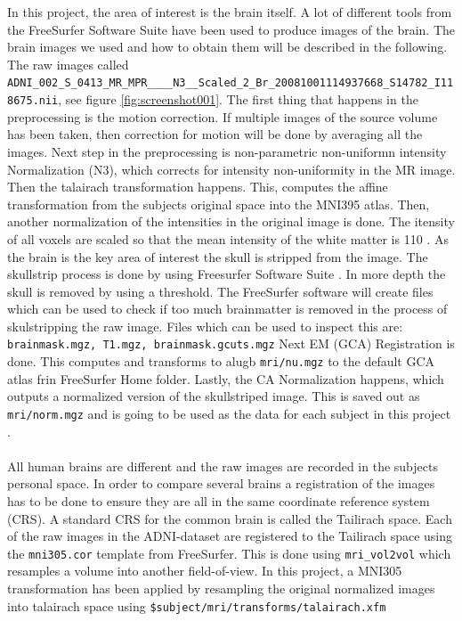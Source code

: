 \documentclass[12pt, fleqn, titlepage]{article}
\begin{document}
In this project, the area of interest is the brain itself. A lot of different tools from the FreeSurfer Software Suite have been used to produce images of the brain. The brain images we used and how to obtain them will be described in the following. The raw images called \newline \texttt{
ADNI\_002\_S\_0413\_MR\_MPR\_\_\_\_N3\_\_Scaled\_2\_Br\_20081001114937668\_S14782\_I118675.nii}, see figure \ref{fig:screenshot001}. The first thing that happens in the preprocessing is the motion correction. If multiple images of the source volume has been taken, then correction for motion will be done by averaging all the images.
Next step in the preprocessing is non-parametric non-uniformn intensity Normalization (N3), which corrects for intensity non-uniformity in the MR image.
Then the talairach transformation happens. This, computes the affine transformation from the subjects original space into the MNI395 atlas.
Then, another normalization of the intensities in the original image is done. The itensity of all voxels are scaled so that the mean intensity of the white matter is 110 \cite{normalize}. 
As the brain is the key area of interest the skull is stripped from the image. The skullstrip process is done by using Freesurfer Software Suite \cite{freesurfer}.
In more depth the skull is removed by using a threshold.
The FreeSurfer software will create files which can be used to check if too much brainmatter is removed in the process of skulstripping the raw image.
Files which can be used to inspect this are: \texttt{brainmask.mgz, T1.mgz, brainmask.gcuts.mgz}
Next EM (GCA) Registration is done. This computes and transforms to alugb \texttt{mri/nu.mgz} to the default GCA atlas frin FreeSurfer Home folder. Lastly, the CA Normalization happens, which outputs a normalized version of the skullstriped image. This is saved out as \texttt{mri/norm.mgz} and is going to be used as the data for each subject in this project \cite{reckon}.
\\\\
All human brains are different and the raw images are recorded in the subjects personal space. 
In order to compare several brains a registration of the images has to be done to ensure they are all in the same coordinate reference system (CRS). 
A standard CRS for the common brain is called the Tailirach space. 
Each of the raw images in the ADNI-dataset are registered to the Tailirach space using the \texttt{mni305.cor} template from FreeSurfer. 
This is done using \texttt{mri\_vol2vol} which resamples a volume into another field-of-view. 
In this project, a MNI305 transformation has been applied by resampling the original normalized images into talairach space using \texttt{\$subject/mri/transforms/talairach.xfm} %
\end{document}
